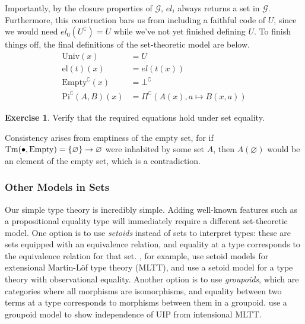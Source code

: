 \documentclass{article}
\renewcommand{\_}{\textrm{\textscale{.5}{\textunderscore}}}
\DeclarePairedDelimiter{\set}{\{}{\}}
\newcommand{\Tm}{\mathrm{Tm}}
\newcommand{\Empty}{\mathrm{Empty}}
\newcommand{\pitype}{\mathrm{Pi}}
\newcommand{\univ}{\mathrm{Univ}}
\newcommand{\El}{\mathrm{el}}
\newcommand{\code}[1]{#1^{\complement}}
\theoremstyle{definition}
\newtheorem{exercise}[definition]{Exercise}
\theoremstyle{plain}
\begin{document}
Importantly, by the closure properties of $\mathcal{G}$, $\mathit{el}_i$ always returns a set in $\mathcal{G}$.
Furthermore, this construction bars us from including a faithful code of $U$,
since we would need $\mathit{el}_0(\code{U}) = U$ while we've not yet finished defining $U$.
To finish things off, the final definitions of the set-theoretic model are below.
%
\begin{align*}
    \univ(x) &= U \\
    \El(t)(x) &= \mathit{el}(t(x)) \\
    \code{\Empty}(x) &= \code{\bot} \\
    \code{\pitype}(A, B)(x) &= \code{\Pi}(A(x), a \mapsto B(x, a))
\end{align*}

\begin{exercise}
Verify that the required equations hold under set equality.
\end{exercise}

Consistency arises from emptiness of the empty set,
for if $\Tm(\bullet, \Empty) = \set{\varnothing} \to \varnothing$ were inhabited by some set $A$,
then $A(\varnothing)$ would be an element of the empty set, which is a contradiction.

\subsubsection{Other Models in Sets}

Our simple type theory is incredibly simple.
Adding well-known features such as a propositional equality type will immediately require a different set-theoretic model.
One option is to use \emph{setoids} instead of sets to interpret types:
these are sets equipped with an equivalence relation,
and equality at a type corresponds to the equivalence relation for that set.
\citet{ext,exteq}, for example, use setoid models for extensional Martin-L\"of type theory (MLTT),
and \citet{obseq} use a setoid model for a type theory with observational equality.
Another option is to use \emph{groupoids},
which are categories where all morphisms are isomorphisms,
and equality between two terms at a type corresponds to morphisms between them in a groupoid.
\citet{groupoid} use a groupoid model to show independence of UIP from intensional MLTT.

\iffalse
There are also models based on realizability semantics,
such as $\omega$-sets \citep{synsem}, $D$-sets \citep{D-sets}, and $\Lambda$-sets \citep{Lambda-sets},
but I can't figure out how they work outside of strong normalization or how they fit into CwFs.
\fi
\end{document}
